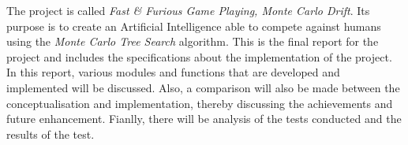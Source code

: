 The project is called \emph{Fast \& Furious Game Playing, Monte Carlo Drift}. Its purpose is to create an Artificial Intelligence able to compete against humans using the \emph{Monte Carlo Tree Search} algorithm.
This is the final report for the  project and includes the specifications about the implementation of the project. In this report, various modules and functions that are developed and implemented will be discussed. Also, a comparison will also be made between the conceptualisation and implementation, thereby discussing the achievements and future enhancement.
Fianlly, there will be analysis  of the tests conducted and the results of the test.












